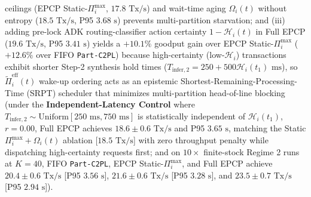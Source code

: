 \documentclass[conference,10pt]{IEEEtran}
\begin{document}
\begin{enumerate}
ceilings (EPCP Static-$\Pi_i^{\max}$, $17.8\text{ Tx/s}$) and wait-time aging $\Omega_i(t)$ without entropy ($18.5\text{ Tx/s}$, P95 $3.68\text{ s}$) prevents multi-partition starvation; and (iii) adding pre-lock ADK routing-classifier action certainty $1 - \mathcal{H}_i(t)$ in Full EPCP ($19.6\text{ Tx/s}$, P95 $3.41\text{ s}$) yields a $+10.1\%$ goodput gain over EPCP Static-$\Pi_i^{\max}$ ($+12.6\%$ over FIFO \texttt{Part-C2PL}) because high-certainty (low-$\mathcal{H}_i$) transactions exhibit shorter Step-2 synthesis hold times ($T_{\text{infer},2} = 250 + 500\mathcal{H}_i(t_1)\text{ ms}$), so $\tilde{\Pi}_i^{\text{eff}}(t)$ wake-up ordering acts as an epistemic Shortest-Remaining-Processing-Time (SRPT) scheduler that minimizes multi-partition head-of-line blocking (under the \textbf{Independent-Latency Control} where $T_{\text{infer},2} \sim \text{Uniform}[250\text{ ms}, 750\text{ ms}]$ is statistically independent of $\mathcal{H}_i(t_1)$, $r=0.00$, Full EPCP achieves $18.6 \pm 0.6\text{ Tx/s}$ and P95 $3.65\text{ s}$, matching the Static $\Pi_i^{\max} + \Omega_i(t)$ ablation [$18.5\text{ Tx/s}$] with zero throughput penalty while dispatching high-certainty requests first; and on $10\times$ finite-stock Regime 2 runs at $K=40$, FIFO \texttt{Part-C2PL}, EPCP Static-$\Pi_i^{\max}$, and Full EPCP achieve $20.4 \pm 0.6\text{ Tx/s}$ [P95 $3.56\text{ s}$], $21.6 \pm 0.6\text{ Tx/s}$ [P95 $3.28\text{ s}$], and $23.5 \pm 0.7\text{ Tx/s}$ [P95 $2.94\text{ s}$]).

\end{enumerate}
\end{document}
